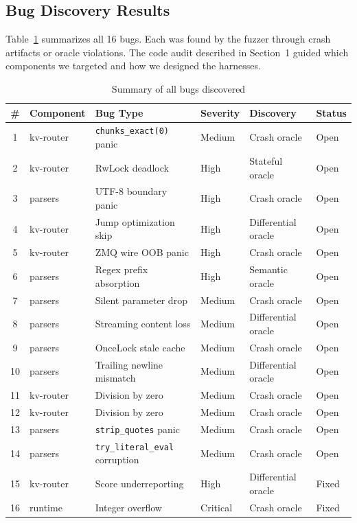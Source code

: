 \documentclass[11pt]{article}
\begin{document}
\subsection{Bug Discovery Results}

Table~\ref{tab:crashes} summarizes all 16 bugs. Each was found by the fuzzer through crash artifacts or oracle violations. The code audit described in Section~1 guided which components we targeted and how we designed the harnesses.

\begin{table}[H]
\centering
\caption{Summary of all bugs discovered}
\label{tab:crashes}
\footnotesize
\begin{tabular}{@{}clllll@{}}
\toprule
\# & Component & Bug Type & Severity & Discovery & Status \\
\midrule
1  & kv-router & \texttt{chunks\_exact(0)} panic & Medium & Crash oracle & Open \\
2  & kv-router & RwLock deadlock & High & Stateful oracle & Open \\
3  & parsers   & UTF-8 boundary panic & High & Crash oracle & Open \\
4  & kv-router & Jump optimization skip & High & Differential oracle & Open \\
5  & kv-router & ZMQ wire OOB panic & High & Crash oracle & Open \\
6  & parsers   & Regex prefix absorption & High & Semantic oracle & Open \\
7  & parsers   & Silent parameter drop & Medium & Crash oracle & Open \\
8  & parsers   & Streaming content loss & Medium & Differential oracle & Open \\
9  & parsers   & OnceLock stale cache & Medium & Crash oracle & Open \\
10 & parsers   & Trailing newline mismatch & Medium & Differential oracle & Open \\
11 & kv-router & Division by zero & Medium & Crash oracle & Open \\
12 & kv-router & Division by zero & Medium & Crash oracle & Open \\
13 & parsers   & \texttt{strip\_quotes} panic & Medium & Crash oracle & Open \\
14 & parsers   & \texttt{try\_literal\_eval} corruption & Medium & Crash oracle & Open \\
15 & kv-router & Score underreporting & High & Differential oracle & Fixed \\
16 & runtime   & Integer overflow & Critical & Crash oracle & Fixed \\
\bottomrule
\end{tabular}
\end{table}
\end{document}
